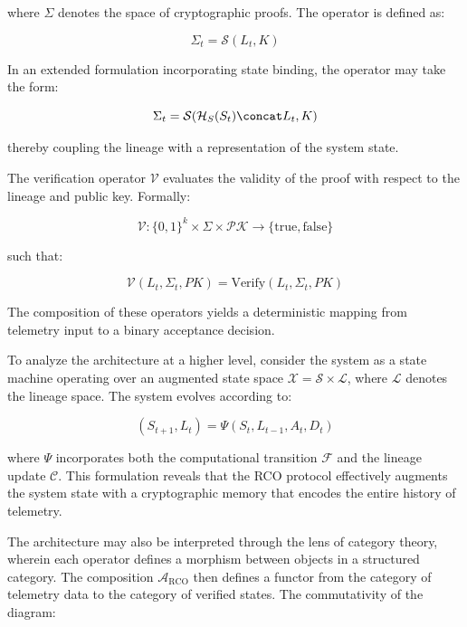 where $\Sigma$ denotes the space of cryptographic proofs. The operator is defined as:

\begin{equation}
\Sigma_t = \mathcal{S}(L_t, K)
\end{equation}

In an extended formulation incorporating state binding, the operator may take the form:

\begin{equation}
\Sigma_t = \mathcal{S}(\mathcal{H}_S(S_t) \concat L_t, K)
\end{equation}

thereby coupling the lineage with a representation of the system state.

The verification operator $\mathcal{V}$ evaluates the validity of the proof with respect to the lineage and public key. Formally:

\begin{equation}
\mathcal{V}: \{0,1\}^k \times \Sigma \times \mathcal{PK} \rightarrow \{\text{true}, \text{false}\}
\end{equation}

such that:

\begin{equation}
\mathcal{V}(L_t, \Sigma_t, PK) = \text{Verify}(L_t, \Sigma_t, PK)
\end{equation}

The composition of these operators yields a deterministic mapping from telemetry input to a binary acceptance decision.

To analyze the architecture at a higher level, consider the system as a state machine operating over an augmented state space $\mathcal{X} = \mathcal{S} \times \mathcal{L}$, where $\mathcal{L}$ denotes the lineage space. The system evolves according to:

\begin{equation}
(S_{t+1}, L_t) = \Psi(S_t, L_{t-1}, A_t, D_t)
\end{equation}

where $\Psi$ incorporates both the computational transition $\mathcal{F}$ and the lineage update $\mathcal{C}$. This formulation reveals that the RCO protocol effectively augments the system state with a cryptographic memory that encodes the entire history of telemetry.

The architecture may also be interpreted through the lens of category theory, wherein each operator defines a morphism between objects in a structured category. The composition $\mathcal{A}_{\text{RCO}}$ then defines a functor from the category of telemetry data to the category of verified states. The commutativity of the diagram:

